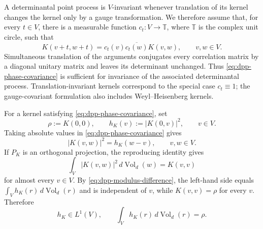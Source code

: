 \documentclass[11pt,reqno,a4paper]{amsart}
\numberwithin{equation}{section}
\theoremstyle{compact}
\theoremstyle{definition}
\theoremstyle{definition}
\newcommand{\Vol}{\operatorname{Vol}}
\begin{document}
A determinantal point process is $V$-invariant whenever translation of its
kernel changes the kernel only by a gauge transformation.  We therefore
assume that, for every $t\in V$, there is a measurable function
$c_t:V\to\mathbb T$, where $\mathbb T$ is the complex unit circle, such that
\begin{equation}\label{eq:dpp-phase-covariance}
  K(v+t,w+t)=c_t(v)\overline{c_t(w)}K(v,w),
  \qquad v,w\in V.
\end{equation}
Simultaneous translation of the arguments conjugates every correlation
matrix by a diagonal unitary matrix and leaves its determinant unchanged.
Thus \eqref{eq:dpp-phase-covariance} is sufficient for invariance of the
associated determinantal process.
Translation-invariant kernels correspond to the special case $c_t\equiv1$;
the gauge-covariant formulation also includes Weyl--Heisenberg kernels.

For a kernel satisfying \eqref{eq:dpp-phase-covariance}, set
\begin{equation}\label{eq:dpp-h-function}
  \rho:=K(0,0),
  \qquad
  h_K(v):=|K(0,v)|^2,
  \qquad v\in V.
\end{equation}
Taking absolute values in \eqref{eq:dpp-phase-covariance} gives
\begin{equation}\label{eq:dpp-modulus-difference}
  |K(v,w)|^2=h_K(w-v),
  \qquad v,w\in V.
\end{equation}
If $P_K$ is an orthogonal projection, the reproducing identity gives
\begin{equation}\label{eq:dpp-projection-identity-ae}
  \int_V |K(v,w)|^2\,d\Vol_d(w)=K(v,v)
\end{equation}
for almost every $v\in V$.  By \eqref{eq:dpp-modulus-difference}, the
left-hand side equals $\int_Vh_K(r)\,d\Vol_d(r)$ and is independent of
$v$, while $K(v,v)=\rho$ for every $v$.  Therefore
\begin{equation}\label{eq:dpp-projection-identity}
  h_K\in L^1(V),
  \qquad
  \int_Vh_K(r)\,d\Vol_d(r)=\rho.
\end{equation}
\end{document}
